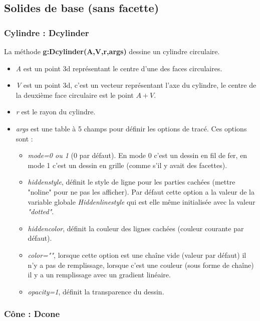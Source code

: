 \subsection{Solides de base (sans facette)}

\subsubsection{ Cylindre : Dcylinder}

La méthode \textbf{g:Dcylinder(A,V,r,args)} dessine un cylindre circulaire.

\begin{itemize}
    \item \emph{A} est un point 3d représentant le centre d'une des faces circulaires.
    \item \emph{V} est un point 3d, c'est un vecteur représentant l'axe du cylindre, le centre de la deuxième face circulaire est le point $A+V$.
    \item \emph{r} est le rayon du cylindre.
    \item \emph{args} est une table à 5 champs pour définir les options de tracé. Ces options sont :
        \begin{itemize}
            \item \emph{mode=0 ou 1} (0 par défaut). En mode 0 c'est un dessin en fil de fer, en mode 1 c'est un dessin en grille (comme s'il y avait des facettes).
            \item \emph{hiddenstyle}, définit le style de ligne pour les parties cachées (mettre "noline" pour ne pas les afficher). Par défaut cette option a la valeur de la variable globale \emph{Hiddenlinestyle} qui est elle même initialisée avec la valeur \emph{"dotted"}.
            \item \emph{hiddencolor}, définit la couleur des lignes cachées (couleur courante par défaut).
            \item \emph{color=""}, lorsque cette option est une chaîne vide (valeur par défaut) il n'y a pas de remplissage,  lorsque c'est une couleur (sous forme de chaîne) il y a un remplissage avec un gradient linéaire.
            \item \emph{opacity=1}, définit la transparence du dessin.
        \end{itemize}
\end{itemize}

\subsubsection{ Cône : Dcone}

